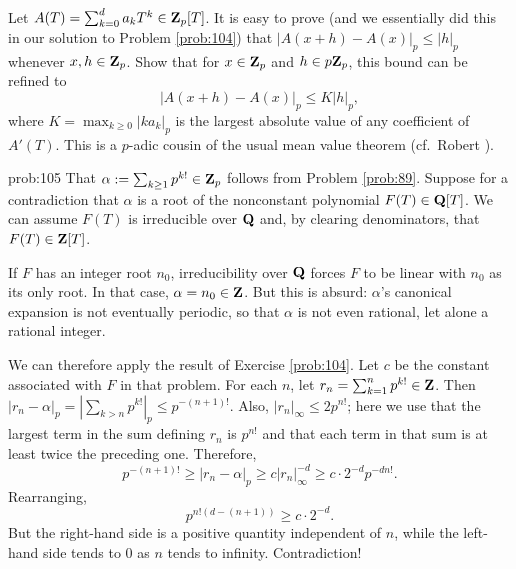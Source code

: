 \begin{challenge} Let $A(T) = \sum_{k=0}^{d} a_k T^k \in \mathbf{Z}_p[T]$. It is easy to prove (and we essentially did this in our solution to Problem \ref{prob:104}) that $|A(x+h) - A(x)|_p \le |h|_p$ whenever $x, h \in \mathbf{Z}_p$. Show that for $x \in \mathbf{Z}_p$ and $h \in p\mathbf{Z}_p$, this bound can be refined to
\[ |A(x+h) - A(x)|_p \le K |h|_p, \]
where $K = \max_{k\ge 0} |k a_k|_p$ is the largest absolute value of any coefficient of $A'(T)$. This is a $p$-adic cousin of the usual mean value theorem (cf.~Robert \cite{robert91}).
\end{challenge}

\begin{sol}{prob:105} That $\alpha := \sum_{k \ge 1} p^{k!} \in \mathbf{Z}_p$ follows from Problem \ref{prob:89}. Suppose for a contradiction that $\alpha$ is a root of the nonconstant polynomial $F(T) \in \mathbf{Q}[T]$. We can assume $F(T)$ is irreducible over $\mathbf{Q}$ and, by clearing denominators, that $F(T) \in \mathbf{Z}[T]$. 

If $F$ has an integer root $n_0$, irreducibility over $\mathbf{Q}$ forces $F$ to be linear with $n_0$ as its only root. In that case, $\alpha = n_0 \in \mathbf{Z}$. But this is absurd: $\alpha$'s canonical expansion is not eventually periodic, so that $\alpha$ is not even rational, let alone a rational integer.

We can therefore apply the result of Exercise \ref{prob:104}. Let $c$ be the constant associated with $F$ in that problem. For each $n$, let $r_n = \sum_{k=1}^{n} p^{k!} \in \mathbf{Z}$. Then $|r_n-\alpha|_p = |\sum_{k > n}p^{k!}|_p \le p^{-(n+1)!}$. Also, $|r_n|_{\infty} \le 2p^{n!}$; here we use that the largest term in the sum defining $r_n$ is $p^{n!}$ and that each term in that sum is at least twice the preceding one. Therefore,
\[ p^{-(n+1)!}\ge |r_n-\alpha|_p \ge c|r_n|_{\infty}^{-d}\ge c \cdot 2^{-d} p^{-d n!}. \]
Rearranging,
\[ p^{n!(d-(n+1))} \ge c \cdot 2^{-d}.\]
But the right-hand side is a positive quantity independent of $n$, while the left-hand side tends to $0$ as $n$ tends to infinity. Contradiction!
\end{sol}

